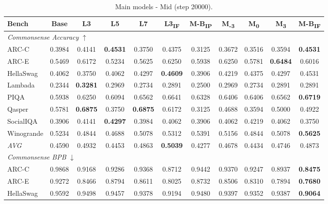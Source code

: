 \begin{table}[htbp]
\centering
\setlength{\tabcolsep}{2.5pt}
\caption{Main models - Mid (step 20000).}
\label{tab:main_mid}
\begin{tabular}{lcccccccccc}
\toprule
Bench & Base & L3 & L5 & L7 & L3\textsubscript{IF} & M-B\textsubscript{IP} & M\textsubscript{-3} & M\textsubscript{0} & M\textsubscript{3} & M-B\textsubscript{IF} \\
\midrule
\multicolumn{11}{l}{\textit{Commonsense Accuracy} $\uparrow$} \\
ARC-C & 0.3984 & 0.4141 & \textbf{0.4531} & 0.3750 & 0.4375 & 0.3125 & 0.3672 & 0.3516 & 0.3594 & \textbf{0.4531} \\
ARC-E & 0.5469 & 0.6172 & 0.5234 & 0.5625 & 0.6250 & 0.5938 & 0.6250 & 0.5781 & \textbf{0.6484} & 0.6016 \\
HellaSwag & 0.4062 & 0.3750 & 0.4062 & 0.4297 & \textbf{0.4609} & 0.3906 & 0.4219 & 0.4375 & 0.4297 & 0.4531 \\
Lambada & 0.2344 & \textbf{0.3281} & 0.2969 & 0.2734 & 0.2891 & 0.2500 & 0.2969 & 0.2734 & 0.2891 & 0.2891 \\
PIQA & 0.5938 & 0.6250 & 0.6094 & 0.6562 & 0.6641 & 0.6328 & 0.6406 & 0.6406 & 0.6562 & \textbf{0.6719} \\
Qasper & 0.5781 & \textbf{0.6875} & 0.3750 & \textbf{0.6875} & 0.6172 & 0.3125 & 0.4688 & 0.3594 & 0.5000 & 0.4922 \\
SocialIQA & 0.3906 & 0.4141 & \textbf{0.4297} & 0.3984 & 0.4062 & 0.3906 & 0.4062 & 0.4219 & 0.4062 & 0.3750 \\
Winogrande & 0.5234 & 0.4844 & 0.4688 & 0.5078 & 0.5312 & 0.5391 & 0.5156 & 0.4844 & 0.5078 & \textbf{0.5625} \\
\textit{AVG} & 0.4590 & 0.4932 & 0.4453 & 0.4863 & \textbf{0.5039} & 0.4277 & 0.4678 & 0.4434 & 0.4746 & 0.4873 \\
\midrule
\multicolumn{11}{l}{\textit{Commonsense BPB} $\downarrow$} \\
ARC-C & 0.9868 & 0.9168 & 0.9286 & 0.9368 & 0.8712 & 0.9442 & 0.9370 & 0.9247 & 0.8937 & \textbf{0.8475} \\
ARC-E & 0.9272 & 0.8466 & 0.8794 & 0.8611 & 0.8025 & 0.8732 & 0.8506 & 0.8310 & 0.7894 & \textbf{0.7680} \\
HellaSwag & 0.9592 & 0.9498 & 0.9457 & 0.9378 & 0.9194 & 0.9480 & 0.9397 & 0.9352 & 0.9387 & \textbf{0.9064} \\

\end{tabular}
\end{table}
